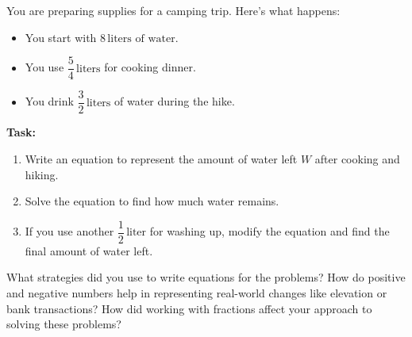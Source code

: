 \documentclass[12pt]{article}
\begin{document}
\vspace{1em}

\begin{tcolorbox}[colframe=black!60, colback=white, 
coltitle=black, colbacktitle=black!15, fonttitle=\bfseries\Large, 
title=Performance Task: Preparing for a Camping Trip, halign title=center, left=10pt, right=10pt, top=10pt, bottom=90pt]
You are preparing supplies for a camping trip. Here’s what happens:
\begin{itemize}
    \item You start with \( 8 \, \text{liters of water} \).
    \item You use \( \dfrac{5}{4} \, \text{liters} \) for cooking dinner.
    \item You drink \( \dfrac{3}{2} \, \text{liters} \) of water during the hike.
\end{itemize}
\textbf{Task:}
\begin{enumerate}[itemsep=4em]
    \item Write an equation to represent the amount of water left \(W\) after cooking and hiking.
    \item Solve the equation to find how much water remains.
    \item If you use another \( \dfrac{1}{2} \, \text{liter} \) for washing up, modify the equation and find the final amount of water left.
\end{enumerate}
\end{tcolorbox}

\begin{tcolorbox}[colframe=black!60, colback=white, 
coltitle=black, colbacktitle=black!15, fonttitle=\bfseries\Large, 
title=Reflection, halign title=center, left=10pt, right=10pt, top=10pt, bottom=100pt]
What strategies did you use to write equations for the problems? How do positive and negative numbers help in representing real-world changes like elevation or bank transactions? How did working with fractions affect your approach to solving these problems?
\end{tcolorbox}
\end{document}
